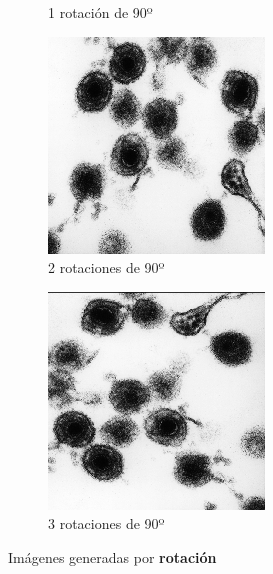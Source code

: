 \documentclass{uc3mpracticas}
\begin{document}
\begin{figure}[!h]
\begin{subfigure}[b]{0.23\textwidth}
      \caption{1 rotación de 90º}
    \end{subfigure}
    \hfill
    \begin{subfigure}[b]{0.23\textwidth}
      \includegraphics[width=\textwidth, frame]{Images/rot902.png}
      \caption{2 rotaciones de 90º}
    \end{subfigure}
    \hfill
    \begin{subfigure}[b]{0.23\textwidth}
      \includegraphics[width=\textwidth, frame]{Images/rot903.png}
      \caption{3 rotaciones de 90º}
    \end{subfigure}

    \caption{Imágenes generadas por \textbf{rotación}}
  \end{figure}
\end{document}
